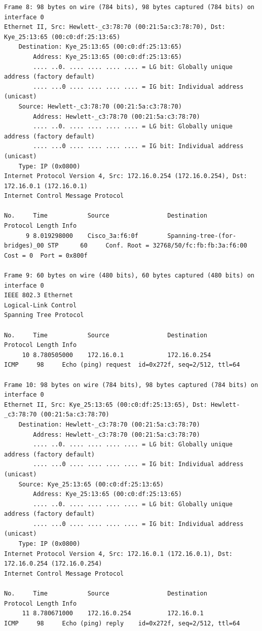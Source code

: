\documentclass[a4paper,11pt]{article}
\begin{document}
\begin{lstlisting}
Frame 8: 98 bytes on wire (784 bits), 98 bytes captured (784 bits) on interface 0
Ethernet II, Src: Hewlett-_c3:78:70 (00:21:5a:c3:78:70), Dst: Kye_25:13:65 (00:c0:df:25:13:65)
    Destination: Kye_25:13:65 (00:c0:df:25:13:65)
        Address: Kye_25:13:65 (00:c0:df:25:13:65)
        .... ..0. .... .... .... .... = LG bit: Globally unique address (factory default)
        .... ...0 .... .... .... .... = IG bit: Individual address (unicast)
    Source: Hewlett-_c3:78:70 (00:21:5a:c3:78:70)
        Address: Hewlett-_c3:78:70 (00:21:5a:c3:78:70)
        .... ..0. .... .... .... .... = LG bit: Globally unique address (factory default)
        .... ...0 .... .... .... .... = IG bit: Individual address (unicast)
    Type: IP (0x0800)
Internet Protocol Version 4, Src: 172.16.0.254 (172.16.0.254), Dst: 172.16.0.1 (172.16.0.1)
Internet Control Message Protocol

No.     Time           Source                Destination           Protocol Length Info
      9 8.019298000    Cisco_3a:f6:0f        Spanning-tree-(for-bridges)_00 STP      60     Conf. Root = 32768/50/fc:fb:fb:3a:f6:00  Cost = 0  Port = 0x800f

Frame 9: 60 bytes on wire (480 bits), 60 bytes captured (480 bits) on interface 0
IEEE 802.3 Ethernet 
Logical-Link Control
Spanning Tree Protocol

No.     Time           Source                Destination           Protocol Length Info
     10 8.780505000    172.16.0.1            172.16.0.254          ICMP     98     Echo (ping) request  id=0x272f, seq=2/512, ttl=64

Frame 10: 98 bytes on wire (784 bits), 98 bytes captured (784 bits) on interface 0
Ethernet II, Src: Kye_25:13:65 (00:c0:df:25:13:65), Dst: Hewlett-_c3:78:70 (00:21:5a:c3:78:70)
    Destination: Hewlett-_c3:78:70 (00:21:5a:c3:78:70)
        Address: Hewlett-_c3:78:70 (00:21:5a:c3:78:70)
        .... ..0. .... .... .... .... = LG bit: Globally unique address (factory default)
        .... ...0 .... .... .... .... = IG bit: Individual address (unicast)
    Source: Kye_25:13:65 (00:c0:df:25:13:65)
        Address: Kye_25:13:65 (00:c0:df:25:13:65)
        .... ..0. .... .... .... .... = LG bit: Globally unique address (factory default)
        .... ...0 .... .... .... .... = IG bit: Individual address (unicast)
    Type: IP (0x0800)
Internet Protocol Version 4, Src: 172.16.0.1 (172.16.0.1), Dst: 172.16.0.254 (172.16.0.254)
Internet Control Message Protocol

No.     Time           Source                Destination           Protocol Length Info
     11 8.780671000    172.16.0.254          172.16.0.1            ICMP     98     Echo (ping) reply    id=0x272f, seq=2/512, ttl=64


\end{lstlisting}
\end{document}
